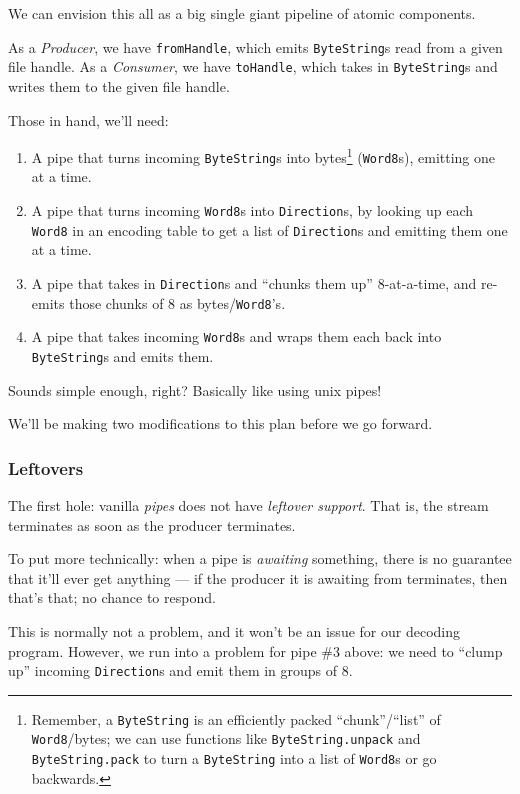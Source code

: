 \documentclass[]{article}
\begin{document}
We can envision this all as a big single giant pipeline of atomic
components.

As a \emph{Producer}, we have \texttt{fromHandle}, which emits
\texttt{ByteString}s read from a given file handle. As a
\emph{Consumer}, we have \texttt{toHandle}, which takes in
\texttt{ByteString}s and writes them to the given file handle.

Those in hand, we'll need:

\begin{enumerate}
\def\labelenumi{\arabic{enumi}.}
\tightlist
\item
  A pipe that turns incoming \texttt{ByteString}s into bytes\footnote{Remember,
    a \texttt{ByteString} is an efficiently packed ``chunk''/``list'' of
    \texttt{Word8}/bytes; we can use functions like
    \texttt{ByteString.unpack} and \texttt{ByteString.pack} to turn a
    \texttt{ByteString} into a list of \texttt{Word8}s or go backwards.}
  (\texttt{Word8}s), emitting one at a time.
\item
  A pipe that turns incoming \texttt{Word8}s into \texttt{Direction}s,
  by looking up each \texttt{Word8} in an encoding table to get a list
  of \texttt{Direction}s and emitting them one at a time.
\item
  A pipe that takes in \texttt{Direction}s and ``chunks them up''
  8-at-a-time, and re-emits those chunks of 8 as bytes/\texttt{Word8}'s.
\item
  A pipe that takes incoming \texttt{Word8}s and wraps them each back
  into \texttt{ByteString}s and emits them.
\end{enumerate}

Sounds simple enough, right? Basically like using unix pipes!

We'll be making two modifications to this plan before we go forward.

\subsubsection{Leftovers}\label{leftovers}

The first hole: vanilla \emph{pipes} does not have \emph{leftover
support}. That is, the stream terminates as soon as the producer
terminates.

To put more technically: when a pipe is \emph{awaiting} something, there
is no guarantee that it'll ever get anything --- if the producer it is
awaiting from terminates, then that's that; no chance to respond.

This is normally not a problem, and it won't be an issue for our
decoding program. However, we run into a problem for pipe \#3 above: we
need to ``clump up'' incoming \texttt{Direction}s and emit them in
groups of 8.
\end{document}
